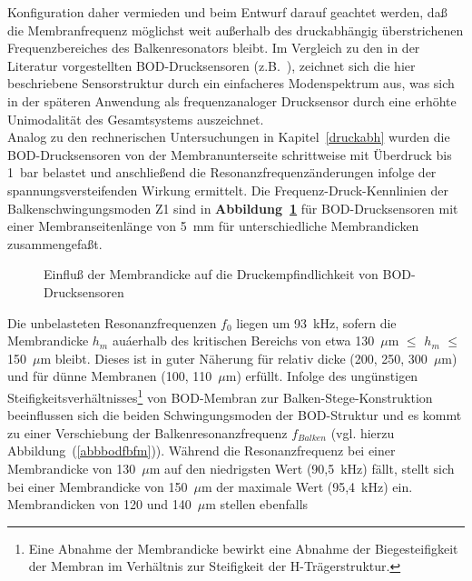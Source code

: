 Konfiguration daher vermieden und beim
Entwurf darauf geachtet werden, daß die Membranfrequenz möglichst weit
außerhalb des druckabhängig überstrichenen Frequenzbereiches des
Balkenresonators bleibt. Im Vergleich zu den in der Literatur vorgestellten
BOD-Drucksensoren (z.B.\ \cite{And88}), zeichnet sich die hier beschriebene
Sensorstruktur durch ein einfacheres Modenspektrum aus, was sich in der
späteren Anwendung als frequenzanaloger Drucksensor durch eine erhöhte
Unimodalität des Gesamtsystems auszeichnet.\\
%
Analog zu den rechnerischen Untersuchungen in Kapitel~\ref{druckabh} wurden
die BOD-Drucksensoren von der Membranunterseite schrittweise mit Überdruck
bis 1~bar belastet und anschließend die Resonanzfrequenzänderungen infolge
der spannungsversteifenden Wirkung ermittelt. Die Frequenz-Druck-Kennlinien
der Balkenschwingungsmoden Z1 sind in {\bf Abbildung~\ref{abbbodmem}}
für BOD-Drucksensoren mit einer Membranseitenlänge von 5~mm für
unterschiedliche Membrandicken zusammengefaßt.
\begin{figure}[htb]

\begin{center}

\setabbsfa
\end{center}
\caption{\label{abbbodmem}
 Einfluß der Membrandicke auf die Druckempfindlichkeit von BOD-Drucksensoren}
\end{figure}
Die unbelasteten Resonanzfrequenzen $f_{0}$ liegen um 93~kHz, sofern die
Membrandicke $h_{m}$ auáerhalb des kritischen Bereichs von etwa
130~$\mu$m $\leq$ $h_{m}$ $\leq$ 150~$\mu$m bleibt. Dieses ist in guter
Näherung für relativ dicke (200, 250, 300~$\mu$m) und für dünne
Membranen (100, 110~$\mu$m) erfüllt. Infolge des ungünstigen
Steifigkeitsverhältnisses\footnote{Eine Abnahme der Membrandicke bewirkt
eine Abnahme der Biegesteifigkeit der Membran im Verhältnis zur Steifigkeit
der H-Trägerstruktur.} von BOD-Membran zur Balken-Stege-Konstruktion
beeinflussen sich die beiden Schwingungsmoden der BOD-Struktur und es kommt
zu einer Verschiebung der Balkenresonanzfrequenz $f_{Balken}$ (vgl. hierzu
Abbildung~(\ref{abbbodfbfm})). Während die Resonanzfrequenz bei einer
Membrandicke von 130~$\mu$m auf den niedrigsten Wert (90,5~kHz) fällt,
stellt sich bei einer Membrandicke von 150~$\mu$m der maximale Wert
(95,4~kHz) ein. Membrandicken von 120 und 140~$\mu$m stellen ebenfalls
